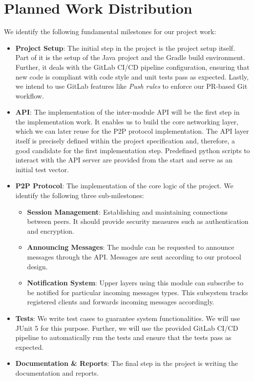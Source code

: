 \documentclass[a4paper, 11pt]{article}
\begin{document}
    \section{Planned Work Distribution}\label{sec:planned-work-distribution}

    We identify the following fundamental milestones for our project work:

    \begin{itemize}
        \setlength\itemsep{0em}
        \item \textbf{Project Setup}: The initial step in the project is the project setup itself.
        Part of it is the setup of the Java project and the Gradle build environment.
        Further, it deals with the GitLab CI/CD pipeline configuration, ensuring that new code is
        compliant with code style and unit tests pass as expected.
        Lastly, we intend to use GitLab features like \textit{Push rules} to enforce our PR-based Git workflow.
        \item \textbf{API}: The implementation of the inter-module API will be the first step in the implementation work.
        It enables us to build the core networking layer, which we can later reuse for the P2P protocol implementation.
        The API layer itself is precisely defined within the project specification and, therefore, a good candidate for the first implementation step.
        Predefined python scripts to interact with the API server are provided from the start and serve as an initial test vector.
        \item \textbf{P2P Protocol}: The implementation of the core logic of the project.
        We identify the following three sub-milestones:
        \begin{itemize}
            \setlength\itemsep{0em}
            \item \textbf{Session Management}: Establishing and maintaining connections between peers.
            It should provide security measures such as authentication and encryption.
            \item \textbf{Announcing Messages}: The module can be requested to announce messages through the API\@.
            Messages are sent according to our protocol design.
            \item \textbf{Notification System}: Upper layers using this module can subscribe to be notified for particular incoming messages types.
            This subsystem tracks registered clients and forwards incoming messages accordingly.
        \end{itemize}
        \item \textbf{Tests}: We write test cases to guarantee system functionalities.
        We will use JUnit 5 for this purpose.
        Further, we will use the provided GitLab CI/CD pipeline to automatically run the tests and ensure that the tests pass as expected.
        \item \textbf{Documentation \& Reports}: The final step in the project is writing the documentation and reports.
    \end{itemize}
\end{document}
